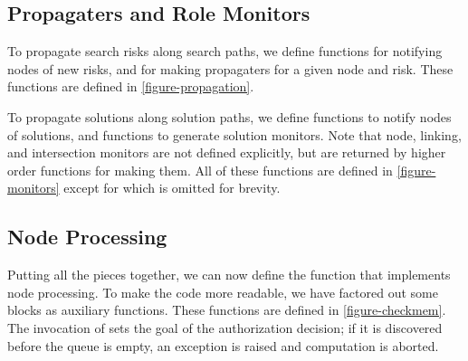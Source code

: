 \subsection{Propagaters and Role Monitors}
\label{appendix-checkmem-monitors}

To propagate search risks along search paths, we define functions
for notifying nodes of new risks, and for making propagaters for 
a given node and risk.  These functions are defined in 
\autoref{figure-propagation}.

\medskip



\smallskip

To propagate solutions along solution paths, we define functions
to notify nodes of solutions, and functions to generate solution
monitors.  Note that node, linking, and intersection monitors
are not defined explicitly, but are returned by higher order 
functions for making them.  All of these functions are defined 
in \autoref{figure-monitors} except for  which
is omitted for brevity.

\medskip







\subsection{Node Processing}
\label{appendix-checkmem-processing}

Putting all the pieces together, we can now define the 
function that implements node processing.  To make the code more 
readable, we have factored out some blocks as auxiliary functions.
These functions are defined in \autoref{figure-checkmem}.  The invocation
of  sets the goal of the authorization decision; 
if it is discovered before the queue is empty, an exception is raised
and computation is aborted.

